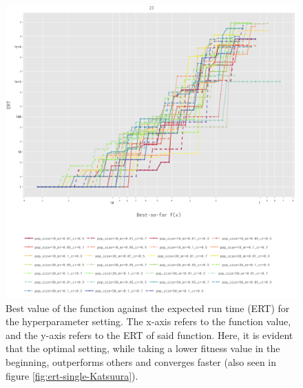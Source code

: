 \documentclass{article}
\begin{document}
\begin{figure}[h!]
    \centering
    \includegraphics[width=1\linewidth]{Graphs/Katsuura/Expected_RunTime_Multi.png}
    \caption{Best value of the function against the expected run time (ERT) for the hyperparameter setting. The x-axis refers to the function value, and the y-axis refers to the ERT of said function. Here, it is evident that the optimal setting, while taking a lower fitness value in the beginning, outperforms others and converges faster (also seen in figure \ref{fig:ert-single-Katsuura}). }
    \label{fig:ert-multiple-Katsuura}
\end{figure}
\end{document}

